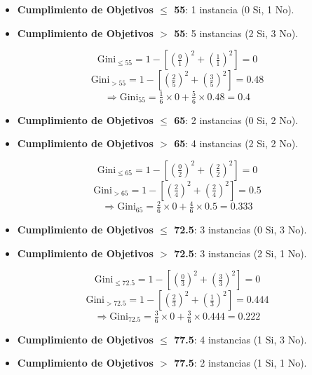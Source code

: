 \documentclass[12pt]{article}
\begin{document}
\begin{itemize}
  \item \textbf{Cumplimiento de Objetivos $\leq$ 55}: 1 instancia (0 Si, 1 No).
  \item \textbf{Cumplimiento de Objetivos $>$ 55}: 5 instancias (2 Si, 3 No).
\end{itemize}

\[
  \mathrm{Gini}_{\leq 55} = 1 - \left[\left(\tfrac{0}{1}\right)^2 + \left(\tfrac{1}{1}\right)^2\right] = 0
\]
\[
  \mathrm{Gini}_{> 55} = 1 - \left[\left(\tfrac{2}{5}\right)^2 + \left(\tfrac{3}{5}\right)^2\right] = 0.48
\]
\[
  \Rightarrow \mathrm{Gini}_{\text{55}} = \tfrac{1}{6}\times0 + \tfrac{5}{6}\times0.48 = 0.4
\]

\begin{itemize}
  \item \textbf{Cumplimiento de Objetivos $\leq$ 65}: 2 instancias (0 Si, 2 No).
  \item \textbf{Cumplimiento de Objetivos $>$ 65}: 4 instancias (2 Si, 2 No).
\end{itemize}

\[
  \mathrm{Gini}_{\leq 65} = 1 - \left[\left(\tfrac{0}{2}\right)^2 + \left(\tfrac{2}{2}\right)^2\right] = 0
\]
\[
  \mathrm{Gini}_{> 65} = 1 - \left[\left(\tfrac{2}{4}\right)^2 + \left(\tfrac{2}{4}\right)^2\right] = 0.5
\]
\[
  \Rightarrow \mathrm{Gini}_{\text{65}} = \tfrac{2}{6}\times0 + \tfrac{4}{6}\times0.5 = 0.333
\]

\begin{itemize}
  \item \textbf{Cumplimiento de Objetivos $\leq$ 72.5}: 3 instancias (0 Si, 3 No).
  \item \textbf{Cumplimiento de Objetivos $>$ 72.5}: 3 instancias (2 Si, 1 No).
\end{itemize}

\[
  \mathrm{Gini}_{\leq 72.5} = 1 - \left[\left(\tfrac{0}{3}\right)^2 + \left(\tfrac{3}{3}\right)^2\right] = 0
\]
\[
  \mathrm{Gini}_{> 72.5} = 1 - \left[\left(\tfrac{2}{3}\right)^2 + \left(\tfrac{1}{3}\right)^2\right] = 0.444
\]
\[
  \Rightarrow \mathrm{Gini}_{\text{72.5}} = \tfrac{3}{6}\times0 + \tfrac{3}{6}\times0.444 = 0.222
\]

\begin{itemize}
  \item \textbf{Cumplimiento de Objetivos $\leq$ 77.5}: 4 instancias (1 Si, 3 No).
  \item \textbf{Cumplimiento de Objetivos $>$ 77.5}: 2 instancias (1 Si, 1 No).
\end{itemize}
\end{document}
